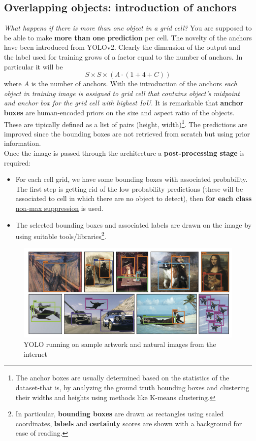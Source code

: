 \subsection{Overlapping objects: introduction of anchors}
\emph{What happens if there is more than one object in a grid cell?} You are supposed to be able to make \textbf{more than one prediction} per cell. The novelty of the anchors have been introduced from YOLOv2. Clearly the dimension of the output and the label used for training grows of a factor equal to the number of anchors. In particular it will be
\begin{equation}
    S\times{S}\times(A\cdot(1+4+C))
\end{equation}
where $A$ is the number of anchors. With the introduction of the anchors \emph{each object in training image is assigned to grid cell that contains object's midpoint and anchor box for the grid cell with highest IoU}. It is remarkable that \textbf{anchor boxes} are human-encoded priors on the size and aspect ratio of the objects. These are tipically defined as a list of pairs (height, width)\footnote{    The anchor boxes are usually determined based on the statistics of the dataset-that is, by analyzing the ground truth bounding boxes and clustering their widths and heights using methods like K-means clustering.
}. The predictions are improved since the bounding boxes are not retrieved from scratch but using prior information.\\
Once the image is passed through the architecture a \textbf{post-processing stage} is required:
\begin{itemize}
    \item For each cell grid, we have some bounding boxes with associated probability.  The first step is getting rid of the low probability predictions (these will be associated to cell in which there are no object to detect), then \textbf{for each class} \underline{non-max suppression} is used.
    \item The selected bounding boxes and associated labels are drawn on the image by using suitable tools/libraries\footnote{
        In particular, \textbf{bounding boxes} are drawn as rectangles using scaled coordinates, \textbf{labels} and \textbf{certainty} scores are shown with a background for ease of reading.
    }.
\end{itemize} 

\begin{figure}
    \centering
    \includegraphics[scale=0.7]{img/YOLO_results.png}
    \caption{YOLO running on sample artwork and natural images from the internet}
\end{figure}

